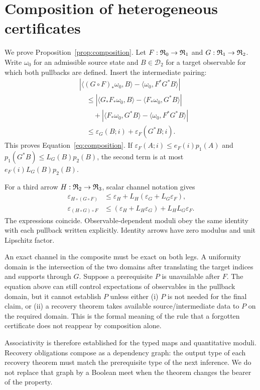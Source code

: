 \section{Composition of heterogeneous certificates}
\label{app:composition}

We prove Proposition~\ref{prop:composition}.  Let
$F:\mathfrak R_0\to\mathfrak R_1$ and $G:\mathfrak R_1\to\mathfrak R_2$.  Write $\omega_0$ for an
admissible source state and $B\in\mathcal D_2$ for a target observable for
which both pullbacks are defined.  Insert the intermediate pairing:
\begin{align*}
&\left|\langle(G\circ F)_*\omega_0,B\rangle
 -\langle\omega_0,F^*G^*B\rangle\right|\\
&\quad\leq
 \left|\langle G_*F_*\omega_0,B\rangle
        -\langle F_*\omega_0,G^*B\rangle\right|\\
&\qquad+
 \left|\langle F_*\omega_0,G^*B\rangle
        -\langle\omega_0,F^*G^*B\rangle\right|\\
&\quad\leq \varepsilon_G(B;i)+\varepsilon_F(G^*B;i).
\end{align*}
This proves Equation~\eqref{eq:composition}.  If
$\varepsilon_F(A;i)\leq e_F(i)p_1(A)$ and
$p_1(G^*B)\leq L_G(B)p_2(B)$, the second term is at most
$e_F(i)L_G(B)p_2(B)$.

For a third arrow $H:\mathfrak R_2\to\mathfrak R_3$, scalar channel notation gives
\begin{align*}
 \varepsilon_{H\circ(G\circ F)}
 &\leq \varepsilon_H+L_H(\varepsilon_G+L_G\varepsilon_F),\\
 \varepsilon_{(H\circ G)\circ F}
 &\leq (\varepsilon_H+L_H\varepsilon_G)+L_HL_G\varepsilon_F.
\end{align*}
The expressions coincide.  Observable-dependent moduli obey the same identity
with each pullback written explicitly.  Identity arrows have zero modulus and
unit Lipschitz factor.

An exact channel in the composite must be exact on both legs.  A uniformity
domain is the intersection of the two domains after translating the target
indices and supports through $G$.  Suppose a prerequisite $P$ is unavailable
after $F$.  The equation above can still control expectations of observables
in the pullback domain, but it cannot establish $P$ unless either (i) $P$ is
not needed for the final claim, or (ii) a recovery theorem takes available
source/intermediate data to $P$ on the required domain.  This is the formal
meaning of the rule that a forgotten certificate does not reappear by
composition alone.

Associativity is therefore established for the typed maps and quantitative
moduli.  Recovery obligations compose as a dependency graph: the output type
of each recovery theorem must match the prerequisite type of the next
inference.  We do not replace that graph by a Boolean meet when the theorem
changes the bearer of the property.
